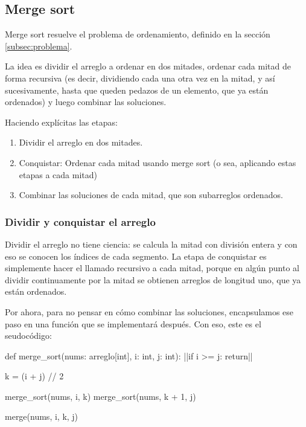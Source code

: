 \subsection{Merge sort}

Merge sort resuelve el problema de ordenamiento, definido en la sección \ref{subsec:problema}.

La idea es dividir el arreglo a ordenar en dos mitades, ordenar cada mitad de forma recursiva (es decir, dividiendo cada una otra vez en la mitad, y así sucesivamente, hasta que queden pedazos de un elemento, que ya están ordenados) y luego combinar las soluciones.

Haciendo explícitas las etapas:
\begin{enumerate}
    \item Dividir el arreglo en dos mitades.
    \item Conquistar: Ordenar cada mitad usando merge sort (o sea, aplicando estas etapas a cada mitad)
    \item Combinar las soluciones de cada mitad, que son subarreglos ordenados.
\end{enumerate}

\subsubsection{Dividir y conquistar el arreglo}

Dividir el arreglo no tiene ciencia: se calcula la mitad con división entera y con eso se conocen los índices de cada segmento. La etapa de conquistar es simplemente hacer el llamado recursivo a cada mitad, porque en algún punto al dividir continuamente por la mitad se obtienen arreglos de longitud uno, que ya están ordenados.

Por ahora, para no pensar en cómo combinar las soluciones, encapsulamos ese paso en una función  que se implementará después. Con eso, este es el seudocódigo:
\begin{pseudocode}
def merge_sort(nums: arreglo[int], i: int, j: int):
    ||if i >= j:
        return||

    k = (i + j) // 2

    merge_sort(nums, i, k)
    merge_sort(nums, k + 1, j)

    merge(nums, i, k, j)
\end{pseudocode}
\begin{annotations}
\end{annotations}

